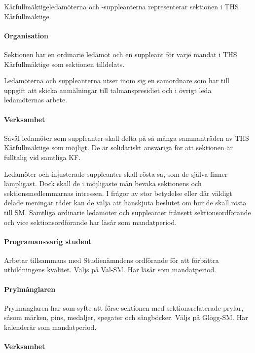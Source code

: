 \documentclass[a4paper,12pt]{article}
\begin{document}
Kårfullmäktigeledamöterna och -suppleanterna representerar sektionen i THS Kårfullmäktige.

\paragraph{Organisation}

Sektionen har en ordinarie ledamot och en suppleant för varje mandat i THS Kårfullmäktige som sektionen tilldelats.

Ledamöterna och suppleanterna utser inom sig en samordnare som har till uppgift att skicka anmälningar till talmanspresidiet och i övrigt leda ledamöternas arbete.

\paragraph{Verksamhet}

Såväl ledamöter som suppleanter skall delta på så många sammanträden av THS Kårfullmäktige som möjligt. De är solidariskt ansvariga för att sektionen är fulltalig vid samtliga KF.

Ledamöter och injusterade suppleanter skall rösta så, som de själva finner lämpligast. Dock skall de i möjligaste mån bevaka sektionens och sektionsmedlemmarnas intressen. I frågor av stor betydelse eller där väldigt delade meningar råder kan de välja att hänskjuta beslutet om hur de skall rösta till SM. Samtliga ordinarie ledamöter och suppleanter frånsett sektionsordförande och vice sektionsordförande har läsår som mandatperiod.

\paragraph{Programansvarig student}

Arbetar tillsammans med Studienämndens ordförande för att förbättra utbildningens kvalitet. Väljs på Val-SM. Har läsår som mandatperiod.

\paragraph{Prylmånglaren}

Prylmånglaren har som syfte att förse sektionen med sektionsrelaterade prylar, såsom märken, pins, medaljer, spegater och sångböcker. Väljs på Glögg-SM. Har kalenderår som mandatperiod.

\paragraph{Verksamhet}
\end{document}
